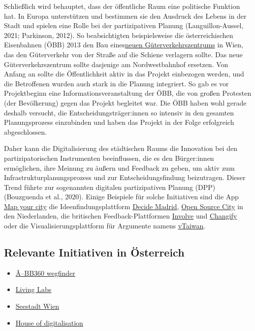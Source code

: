 \documentclass[
]{book}
\providecommand{\tightlist}{%
  \setlength{\itemsep}{0pt}\setlength{\parskip}{0pt}}
\begin{document}
Schließlich wird behauptet, dass der öffentliche Raum eine politische Funktion hat. In Europa unterstützen und bestimmen sie den Ausdruck des Lebens in der Stadt und spielen eine Rolle bei der partizipativen Planung (Languillon-Aussel, 2021; Parkinson, 2012). So beabsichtigten beispielsweise die österreichischen Eisenbahnen (ÖBB) 2013 den Bau eines\href{https://www.partizipation.at/gueterzentrum_sued.html}{neuen Güterverkehrszentrums} in Wien, das den Güterverkehr von der Straße auf die Schiene verlagern sollte. Das neue Güterverkehrszentrum sollte dasjenige am Nordwestbahnhof ersetzen. Von Anfang an sollte die Öffentlichkeit aktiv in das Projekt einbezogen werden, und die Betroffenen wurden auch stark in die Planung integriert. So gab es vor Projektbeginn eine Informationsveranstaltung der ÖBB, die von großen Protesten (der Bevölkerung) gegen das Projekt begleitet war. Die ÖBB haben wohl gerade deshalb versucht, die Entscheidungsträger:innen so intensiv in den gesamten Planungsprozess einzubinden und haben das Projekt in der Folge erfolgreich abgeschlossen.

Daher kann die Digitalisierung des städtischen Raums die Innovation bei den partizipatorischen Instrumenten beeinflussen, die es den Bürger:innen ermöglichen, ihre Meinung zu äußern und Feedback zu geben, um aktiv zum Infrastrukturplanungsprozess und zur Entscheidungsfindung beizutragen. Dieser Trend führte zur sogenannten digitalen partizipativen Planung (DPP) (Bouzguenda et al., 2020). Einige Beispiele für solche Initiativen sind die App \href{https://mapyour.city/}{Map your city} die Ideenfindungsplattform \href{https://www.involve.org.uk/resources/case-studies/decide-madrid}{Decide Madrid}, \href{https://oscity.nl/}{Open Source City} in den Niederlanden, die britischen Feedback-Plattformen \href{https://www.involve.org.uk/resources/knowledge-base/what/public-participation}{Involve} und \href{http://www.changify.org/}{Changify} oder die Visualisierungsplattform für Argumente namens \href{https://www.nesta.org.uk/feature/six-pioneers-digital-democracy/vtaiwan/}{vTaiwan}.

\hypertarget{relevante-initiativen-in-uxf6sterreich-6}{%
\subsection*{Relevante Initiativen in Österreich}\label{relevante-initiativen-in-uxf6sterreich-6}}

\begin{itemize}
\tightlist
\item
  \href{https://wegfinder.at/presse/2021/mit-wegfinder-ist-mobility-as-a-service-in-oesterreich-angekommen(1)/}{Ã--BB360 wegfinder}
\item
  \href{https://austriatech.at/en/insight-into-the-work-of-the-urban-mobility-laboratories/}{Living Labs}
\item
  \href{https://www.aspern-seestadt.at/en}{Seestadt Wien}
\item
  \href{https://ec.europa.eu/regional_policy/en/projects/Austria/support-for-digital-transformation-in-lower-austria}{House of digitalisation}
\end{itemize}
\end{document}
